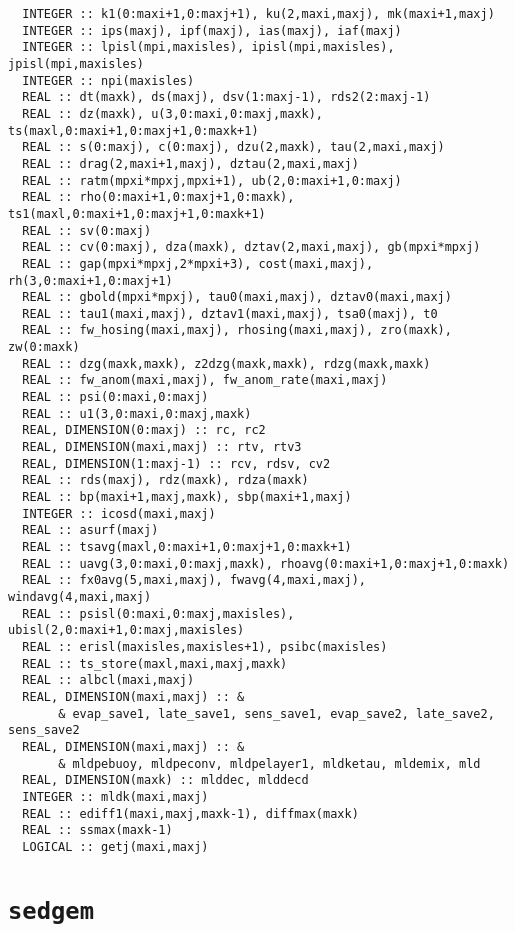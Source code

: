 \documentclass[a4paper,10pt,article]{memoir}
\begin{document}
\begin{verbatim}
  INTEGER :: k1(0:maxi+1,0:maxj+1), ku(2,maxi,maxj), mk(maxi+1,maxj)
  INTEGER :: ips(maxj), ipf(maxj), ias(maxj), iaf(maxj)
  INTEGER :: lpisl(mpi,maxisles), ipisl(mpi,maxisles), jpisl(mpi,maxisles)
  INTEGER :: npi(maxisles)
  REAL :: dt(maxk), ds(maxj), dsv(1:maxj-1), rds2(2:maxj-1)
  REAL :: dz(maxk), u(3,0:maxi,0:maxj,maxk), ts(maxl,0:maxi+1,0:maxj+1,0:maxk+1)
  REAL :: s(0:maxj), c(0:maxj), dzu(2,maxk), tau(2,maxi,maxj)
  REAL :: drag(2,maxi+1,maxj), dztau(2,maxi,maxj)
  REAL :: ratm(mpxi*mpxj,mpxi+1), ub(2,0:maxi+1,0:maxj)
  REAL :: rho(0:maxi+1,0:maxj+1,0:maxk), ts1(maxl,0:maxi+1,0:maxj+1,0:maxk+1)
  REAL :: sv(0:maxj)
  REAL :: cv(0:maxj), dza(maxk), dztav(2,maxi,maxj), gb(mpxi*mpxj)
  REAL :: gap(mpxi*mpxj,2*mpxi+3), cost(maxi,maxj), rh(3,0:maxi+1,0:maxj+1)
  REAL :: gbold(mpxi*mpxj), tau0(maxi,maxj), dztav0(maxi,maxj)
  REAL :: tau1(maxi,maxj), dztav1(maxi,maxj), tsa0(maxj), t0
  REAL :: fw_hosing(maxi,maxj), rhosing(maxi,maxj), zro(maxk), zw(0:maxk)
  REAL :: dzg(maxk,maxk), z2dzg(maxk,maxk), rdzg(maxk,maxk)
  REAL :: fw_anom(maxi,maxj), fw_anom_rate(maxi,maxj)
  REAL :: psi(0:maxi,0:maxj)
  REAL :: u1(3,0:maxi,0:maxj,maxk)
  REAL, DIMENSION(0:maxj) :: rc, rc2
  REAL, DIMENSION(maxi,maxj) :: rtv, rtv3
  REAL, DIMENSION(1:maxj-1) :: rcv, rdsv, cv2
  REAL :: rds(maxj), rdz(maxk), rdza(maxk)
  REAL :: bp(maxi+1,maxj,maxk), sbp(maxi+1,maxj)
  INTEGER :: icosd(maxi,maxj)
  REAL :: asurf(maxj)
  REAL :: tsavg(maxl,0:maxi+1,0:maxj+1,0:maxk+1)
  REAL :: uavg(3,0:maxi,0:maxj,maxk), rhoavg(0:maxi+1,0:maxj+1,0:maxk)
  REAL :: fx0avg(5,maxi,maxj), fwavg(4,maxi,maxj), windavg(4,maxi,maxj)
  REAL :: psisl(0:maxi,0:maxj,maxisles), ubisl(2,0:maxi+1,0:maxj,maxisles)
  REAL :: erisl(maxisles,maxisles+1), psibc(maxisles)
  REAL :: ts_store(maxl,maxi,maxj,maxk)
  REAL :: albcl(maxi,maxj)
  REAL, DIMENSION(maxi,maxj) :: &
       & evap_save1, late_save1, sens_save1, evap_save2, late_save2, sens_save2
  REAL, DIMENSION(maxi,maxj) :: &
       & mldpebuoy, mldpeconv, mldpelayer1, mldketau, mldemix, mld
  REAL, DIMENSION(maxk) :: mlddec, mlddecd
  INTEGER :: mldk(maxi,maxj)
  REAL :: ediff1(maxi,maxj,maxk-1), diffmax(maxk)
  REAL :: ssmax(maxk-1)
  LOGICAL :: getj(maxi,maxj)
\end{verbatim}

\section{\texttt{sedgem}}
\end{document}
